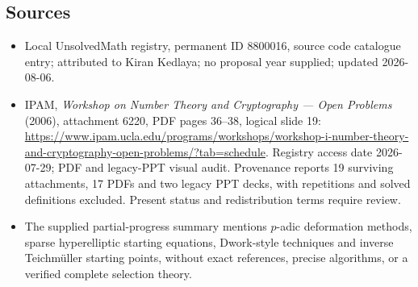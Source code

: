 \documentclass[11pt]{article}
\begin{document}
\subsection{Sources}
\begin{itemize}
\item Local UnsolvedMath registry, permanent ID 8800016, source code catalogue entry; attributed to Kiran Kedlaya; no proposal year supplied; updated 2026-08-06.
\item IPAM, \emph{Workshop on Number Theory and Cryptography --- Open Problems} (2006), attachment 6220, PDF pages 36--38, logical slide 19: \url{https://www.ipam.ucla.edu/programs/workshops/workshop-i-number-theory-and-cryptography-open-problems/?tab=schedule}. Registry access date 2026-07-29; PDF and legacy-PPT visual audit. Provenance reports 19 surviving attachments, 17 PDFs and two legacy PPT decks, with repetitions and solved definitions excluded. Present status and redistribution terms require review.
\item The supplied partial-progress summary mentions \(p\)-adic deformation methods, sparse hyperelliptic starting equations, Dwork-style techniques and inverse Teichm\"uller starting points, without exact references, precise algorithms, or a verified complete selection theory.
\end{itemize}
\end{document}
